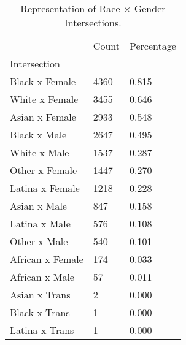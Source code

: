 \begin{table}[htbp]
\centering
\caption{Representation of Race × Gender Intersections.}
\label{tab:eda_intersections}
\begin{tabular}{lll}
\toprule
 & Count & Percentage \\
Intersection &  &  \\
\midrule
Black x Female & 4360 & 0.815 \\
White x Female & 3455 & 0.646 \\
Asian x Female & 2933 & 0.548 \\
Black x Male & 2647 & 0.495 \\
White x Male & 1537 & 0.287 \\
Other x Female & 1447 & 0.270 \\
Latina x Female & 1218 & 0.228 \\
Asian x Male & 847 & 0.158 \\
Latina x Male & 576 & 0.108 \\
Other x Male & 540 & 0.101 \\
African x Female & 174 & 0.033 \\
African x Male & 57 & 0.011 \\
Asian x Trans & 2 & 0.000 \\
Black x Trans & 1 & 0.000 \\
Latina x Trans & 1 & 0.000 \\
\bottomrule
\end{tabular}

\end{table}